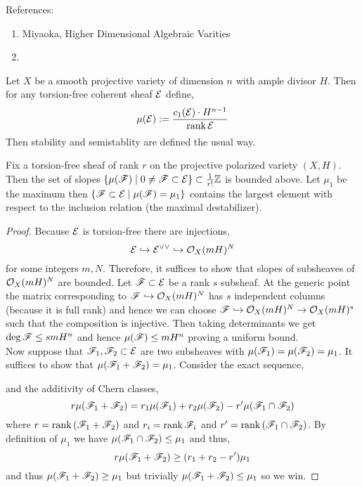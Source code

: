 \documentclass[12pt]{article}
\begin{document}
References:
\begin{enumerate}
\item Miyaoka, Higher Dimensional Algebraic Varities
\item 
\end{enumerate}

Let $X$ be a smooth projective variety of dimension $n$ with ample divisor $H$. Then for any torsion-free coherent sheaf $\mathcal{E}$ define,
\[ \mu(\mathcal{E}) := \frac{c_1(\mathcal{E}) \cdot H^{n-1}}{\operatorname{\mathrm{rank}}{\mathcal{E}}} \]
Then stability and semistablity are defined the usual way.

\begin{prop}
Fix a torsion-free sheaf of rank $r$ on the projective polarized variety $(X, H)$. Then the set of slopes $\{ \mu(\mathscr{F}) \mid 0 \neq \mathscr{F} \subset \mathcal{E} \} \subset \frac{1}{r!} \mathbb{Z}$ is bounded above. Let $\mu_1$ be the maximum then $\{ \mathscr{F} \subset \mathcal{E} \mid \mu(\mathscr{F}) = \mu_1 \}$ contains the largest element with respect to the inclusion relation (the maximal destabilizer).
\end{prop}

\begin{proof}
Because $\mathcal{E}$ is torsion-free there are injections,
\[ \mathcal{E} \hookrightarrow \mathcal{E}^{\vee \vee} \hookrightarrow \mathcal{O}_{X}(mH)^N \]
for some integers $m, N$. Therefore, it suffices to show that slopes of subsheaves of $\mathcal{O}_{X}(mH)^N$ are bounded. Let $\mathscr{F} \subset \mathcal{E}$ be a rank $s$ subsheaf. At the generic point the matrix corresponding to $\mathscr{F} \hookrightarrow \mathcal{O}_{X}(mH)^N$ has $s$ independent columns (because it is full rank) and hence we can choose $\mathscr{F} \hookrightarrow \mathcal{O}_{X}(mH)^N \to \mathcal{O}_{X}(mH)^s$ such that the composition is injective. Then taking determinants we get $\deg{\mathscr{F}} \le s m H^n$ and hence $\mu(\mathscr{F}) \le m H^n$ proving a uniform bound.
\bigskip\\
Now suppose that $\mathscr{F}_1, \mathscr{F}_2 \subset \mathcal{E}$ are two subsheaves with $\mu(\mathscr{F}_1) = \mu(\mathscr{F}_2) = \mu_1$. It suffices to show that $\mu(\mathscr{F}_1 + \mathscr{F}_2) = \mu_1$. Consider the exact sequence,
\begin{center}
\end{center}
and the additivity of Chern classes,
\[ r \mu(\mathscr{F}_1 + \mathscr{F}_2) = r_1 \mu(\mathscr{F}_1) + r_2 \mu(\mathscr{F}_2) - r' \mu(\mathscr{F}_1 \cap \mathscr{F}_2) \]
where $r = \operatorname{\mathrm{rank}}{(\mathscr{F}_1 + \mathscr{F}_2)}$ and $r_i = \operatorname{\mathrm{rank}}{\mathscr{F}_i}$ and $r' = \operatorname{\mathrm{rank}}{(\mathscr{F}_1 \cap \mathscr{F}_2)}$. By definition of $\mu_1$ we have $\mu(\mathscr{F}_1 \cap \mathscr{F}_2) \le \mu_1$ and thus,
\[ r \mu(\mathscr{F}_1 + \mathscr{F}_2) \ge (r_1 + r_2 - r') \mu_1 \]
and thus $\mu(\mathscr{F}_1 + \mathscr{F}_2) \ge \mu_1$ but trivially $\mu(\mathscr{F}_1 + \mathscr{F}_2) \le \mu_1$ so we win. 
\end{proof}
\end{document}

